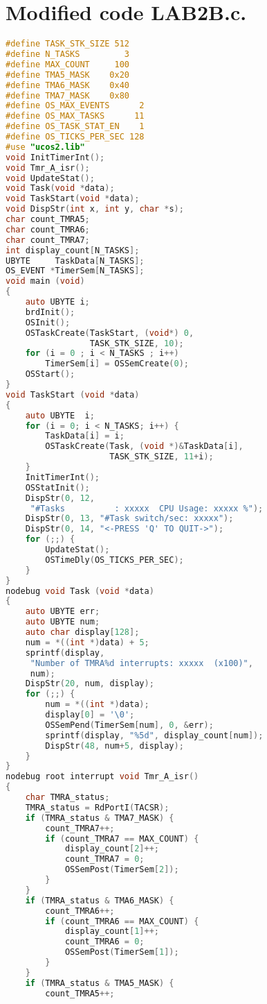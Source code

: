 \section{Modified code LAB2B.c.}
\begin{lstlisting}[language=C]
#define TASK_STK_SIZE 512
#define N_TASKS         3
#define MAX_COUNT     100
#define TMA5_MASK    0x20
#define TMA6_MASK    0x40
#define TMA7_MASK    0x80
#define OS_MAX_EVENTS      2
#define OS_MAX_TASKS      11
#define OS_TASK_STAT_EN    1
#define OS_TICKS_PER_SEC 128
#use "ucos2.lib"
void InitTimerInt();
void Tmr_A_isr();
void UpdateStat();
void Task(void *data);
void TaskStart(void *data);
void DispStr(int x, int y, char *s);
char count_TMRA5;
char count_TMRA6;
char count_TMRA7;
int display_count[N_TASKS];
UBYTE     TaskData[N_TASKS];
OS_EVENT *TimerSem[N_TASKS];
void main (void)
{
    auto UBYTE i;
    brdInit();
    OSInit();
    OSTaskCreate(TaskStart, (void*) 0,
                 TASK_STK_SIZE, 10);
    for (i = 0 ; i < N_TASKS ; i++)
        TimerSem[i] = OSSemCreate(0);
    OSStart();
}
void TaskStart (void *data)
{
    auto UBYTE  i;
    for (i = 0; i < N_TASKS; i++) {
        TaskData[i] = i;
        OSTaskCreate(Task, (void *)&TaskData[i],
                     TASK_STK_SIZE, 11+i);
    }
    InitTimerInt();
    OSStatInit();
    DispStr(0, 12,
     "#Tasks          : xxxxx  CPU Usage: xxxxx %");
    DispStr(0, 13, "#Task switch/sec: xxxxx");
    DispStr(0, 14, "<-PRESS 'Q' TO QUIT->");
    for (;;) {
        UpdateStat();
        OSTimeDly(OS_TICKS_PER_SEC);
    }
}
nodebug void Task (void *data)
{
    auto UBYTE err;
    auto UBYTE num;
    auto char display[128];
    num = *((int *)data) + 5;
    sprintf(display,
     "Number of TMRA%d interrupts: xxxxx  (x100)",
     num);
    DispStr(20, num, display);
    for (;;) {
        num = *((int *)data);
        display[0] = '\0';
        OSSemPend(TimerSem[num], 0, &err);
        sprintf(display, "%5d", display_count[num]);
        DispStr(48, num+5, display);
    }
}
nodebug root interrupt void Tmr_A_isr()
{
    char TMRA_status;
    TMRA_status = RdPortI(TACSR);
    if (TMRA_status & TMA7_MASK) {
        count_TMRA7++;
        if (count_TMRA7 == MAX_COUNT) {
            display_count[2]++;
            count_TMRA7 = 0;
            OSSemPost(TimerSem[2]);
        }
    }
    if (TMRA_status & TMA6_MASK) {
        count_TMRA6++;
        if (count_TMRA6 == MAX_COUNT) {
            display_count[1]++;
            count_TMRA6 = 0;
            OSSemPost(TimerSem[1]);
        }
    }
    if (TMRA_status & TMA5_MASK) {
        count_TMRA5++;

\end{lstlisting}
